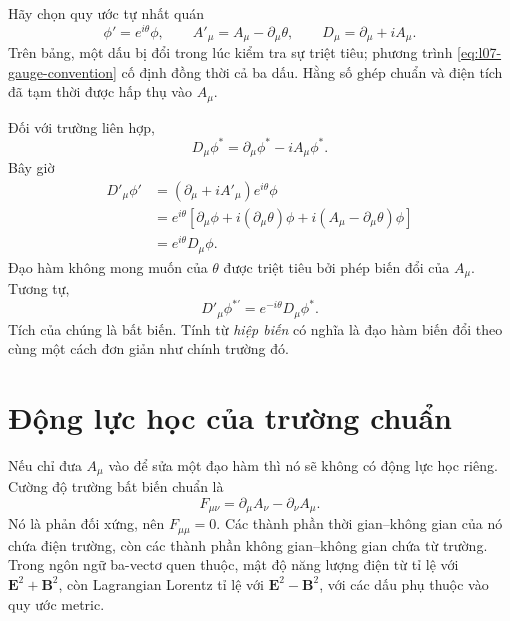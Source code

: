 Hãy chọn quy ước tự nhất quán
\begin{equation}
  \phi'=e^{i\theta}\phi,
  \qquad
  A'_\mu=A_\mu-\partial_\mu\theta,
  \qquad
  D_\mu=\partial_\mu+iA_\mu.
  \label{eq:l07-gauge-convention}
\end{equation}
Trên bảng, một dấu bị đổi trong lúc kiểm tra sự triệt tiêu; phương trình \eqref{eq:l07-gauge-convention} cố định đồng thời cả ba dấu. Hằng số ghép chuẩn và điện tích đã tạm thời được hấp thụ vào \(A_\mu\).

Đối với trường liên hợp,
\begin{equation}
  D_\mu\phi^*=\partial_\mu\phi^*-iA_\mu\phi^*.
\end{equation}
Bây giờ
\begin{align}
  D'_\mu\phi'
  &=
  \left(\partial_\mu+iA'_\mu\right)e^{i\theta}\phi
  \nonumber\\
  &=
  e^{i\theta}
  \left[
    \partial_\mu\phi+i(\partial_\mu\theta)\phi
    +i(A_\mu-\partial_\mu\theta)\phi
  \right]
  \nonumber\\
  &=e^{i\theta}D_\mu\phi.
  \label{eq:l07-covariant-transform}
\end{align}
Đạo hàm không mong muốn của \(\theta\) được triệt tiêu bởi phép biến đổi của \(A_\mu\). Tương tự,
\begin{equation}
  D'_\mu\phi^{*\prime}=e^{-i\theta}D_\mu\phi^*.
\end{equation}
Tích của chúng là bất biến. Tính từ \emph{hiệp biến} có nghĩa là đạo hàm biến đổi theo cùng một cách đơn giản như chính trường đó.

\section{Động lực học của trường chuẩn}

Nếu chỉ đưa \(A_\mu\) vào để sửa một đạo hàm thì nó sẽ không có động lực học riêng. Cường độ trường bất biến chuẩn là
\begin{equation}
  F_{\mu\nu}
  =\partial_\mu A_\nu-\partial_\nu A_\mu.
  \label{eq:l07-field-strength}
\end{equation}
Nó là phản đối xứng, nên \(F_{\mu\mu}=0\). Các thành phần thời gian--không gian của nó chứa điện trường, còn các thành phần không gian--không gian chứa từ trường. Trong ngôn ngữ ba-vectơ quen thuộc, mật độ năng lượng điện từ tỉ lệ với \(\bm E^2+\bm B^2\), còn Lagrangian Lorentz tỉ lệ với \(\bm E^2-\bm B^2\), với các dấu phụ thuộc vào quy ước metric.

